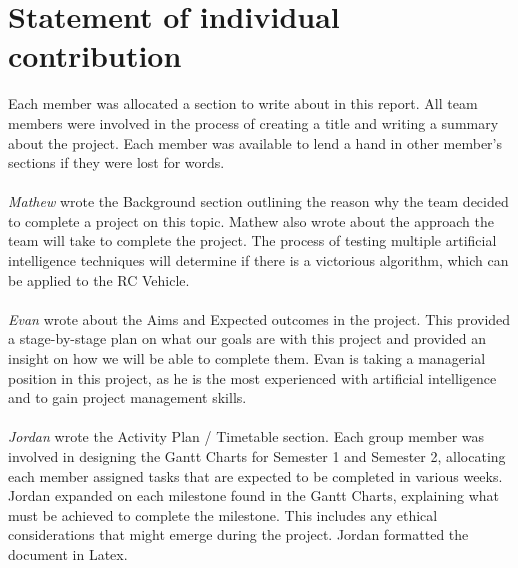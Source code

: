 \documentclass[8pt]{article}
\begin{document}
\newpage


%
%
% 

\section{Statement of individual contribution}
Each member was allocated a section to write about in this report. All team members were involved in the process of creating a title and writing a summary about the project. Each member was available to lend a hand in other member’s sections if they were lost for words.
\\\\
\emph{Mathew} wrote the Background section outlining the reason why the team decided to complete a project on this topic. Mathew also wrote about the approach the team will take to complete the project. The process of testing multiple artificial intelligence techniques will determine if there is a victorious algorithm, which can be applied to the RC Vehicle.
\\\\
\emph{Evan} wrote about the Aims and Expected outcomes in the project. This provided a stage-by-stage plan on what our goals are with this project and provided an insight on how we will be able to complete them. Evan is taking a managerial position in this project, as he is the most experienced with artificial intelligence and to gain project management skills.
\\\\
\emph{Jordan} wrote the Activity Plan / Timetable section. Each group member was involved in designing the Gantt Charts for Semester 1 and Semester 2, allocating each member assigned tasks that are expected to be completed in various weeks. Jordan expanded on each milestone found in the Gantt Charts, explaining what must be achieved to complete the milestone. This includes any ethical considerations that might emerge during the project. Jordan formatted the document in Latex.


\newpage



%
%
%
\end{document}
